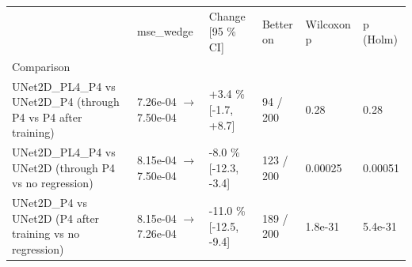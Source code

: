 \begin{tabular}{llllll}
\toprule
 & mse\_wedge & Change [95 \% CI] & Better on & Wilcoxon p & p (Holm) \\
Comparison &  &  &  &  &  \\
\midrule
UNet2D\_PL4\_P4 vs UNet2D\_P4 (through P4 vs P4 after training) & 7.26e-04 $\rightarrow$ 7.50e-04 & +3.4 \% [-1.7, +8.7] & 94 / 200 & 0.28 & 0.28 \\
UNet2D\_PL4\_P4 vs UNet2D (through P4 vs no regression) & 8.15e-04 $\rightarrow$ 7.50e-04 & -8.0 \% [-12.3, -3.4] & 123 / 200 & 0.00025 & 0.00051 \\
UNet2D\_P4 vs UNet2D (P4 after training vs no regression) & 8.15e-04 $\rightarrow$ 7.26e-04 & -11.0 \% [-12.5, -9.4] & 189 / 200 & 1.8e-31 & 5.4e-31 \\
\bottomrule
\end{tabular}
